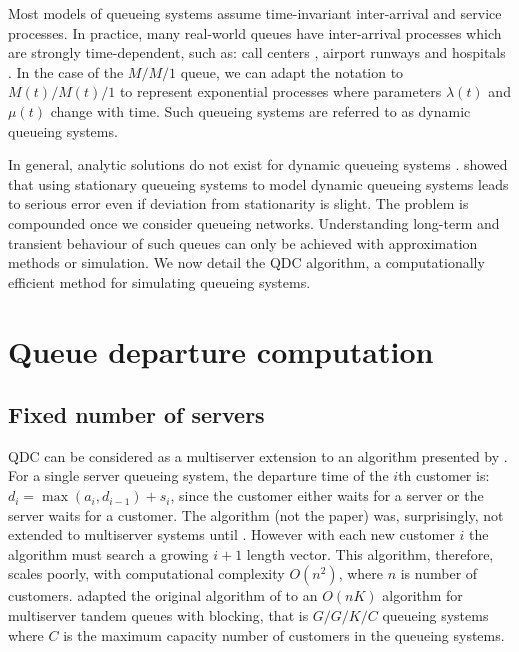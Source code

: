 \documentclass[article]{jss}
\begin{document}
Most models of queueing systems assume time-invariant inter-arrival and service processes. In practice, many real-world queues have inter-arrival processes which are strongly time-dependent, such as: call centers \citep{weinberg2007bayesian, brown2005statistical}, airport runways \citep{koopman1972air} and hospitals \citep{brahimi_queueing_1991}. In the case of the $M/M/1$ queue, we can adapt the notation to $M(t)/M(t)/1$ to represent exponential  processes where parameters $\lambda(t)$ and $\mu(t)$ change with time. Such queueing systems are referred to as dynamic queueing systems.  

In general, analytic solutions do not exist for dynamic queueing systems \citep{malone1995dynamic, worthington2009reflections}. \citet{green1991some} showed that using stationary queueing systems to model dynamic queueing systems leads to serious error even if deviation from stationarity is slight. The problem is compounded once we consider queueing networks. Understanding long-term and transient behaviour of such queues can only be achieved with approximation methods or simulation. We now detail the QDC algorithm, a computationally efficient method for simulating queueing systems. 

\section{Queue departure computation} \label{sec:QDC}

\subsection{Fixed number of servers}

QDC can be considered as a multiserver extension to an algorithm presented by \citet{lindley_theory_1952}. For a single server queueing system, the departure time of the $i$th customer is: $d_i = \max{(a_i, d_{i-1})} + s_i$, since the customer either waits for a server or the server waits for a customer. The algorithm (not the paper) was, surprisingly, not extended to multiserver systems until \citet{krivulin_recursive_1994}. However with each new customer $i$ the algorithm must search a growing $i+1$ length vector. This algorithm, therefore, scales poorly, with computational complexity $O(n^2)$, where $n$ is number of customers. \citet{kin_generalized_2010} adapted the original algorithm of \citet{kiefer_theory_1955} to an $O(nK)$ algorithm for multiserver tandem queues with blocking, that is $G/G/K/C$ queueing systems where $C$ is the maximum capacity number of customers in the queueing systems. 
\end{document}

